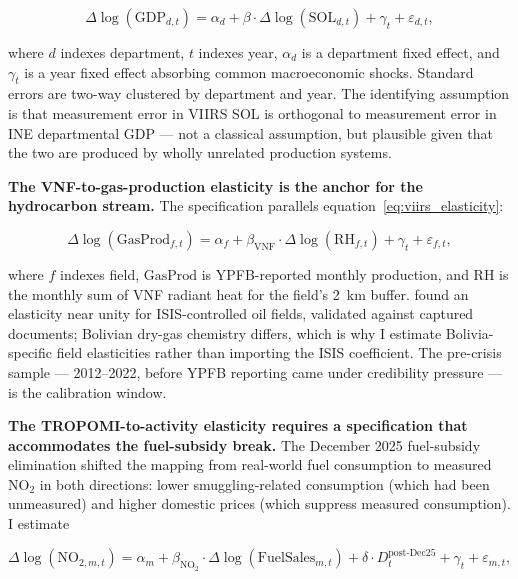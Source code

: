 \documentclass[11pt,letterpaper]{article}
\newcommand{\claim}[1]{\textbf{#1.}}
\begin{document}
\begin{equation}
\Delta \log(\text{GDP}_{d,t}) = \alpha_d + \beta \cdot \Delta \log(\text{SOL}_{d,t}) + \gamma_t + \varepsilon_{d,t},
\label{eq:viirs_elasticity}
\end{equation}

where $d$ indexes department, $t$ indexes year, $\alpha_d$ is a department fixed effect, and $\gamma_t$ is a year fixed effect absorbing common macroeconomic shocks. Standard errors are two-way clustered by department and year. The identifying assumption is that measurement error in VIIRS SOL is orthogonal to measurement error in INE departmental GDP --- not a classical assumption, but plausible given that the two are produced by wholly unrelated production systems.

\claim{The VNF-to-gas-production elasticity is the anchor for the hydrocarbon stream} The specification parallels equation~\eqref{eq:viirs_elasticity}:

\begin{equation}
\Delta \log(\text{GasProd}_{f,t}) = \alpha_f + \beta_{\text{VNF}} \cdot \Delta \log(\text{RH}_{f,t}) + \gamma_t + \varepsilon_{f,t},
\label{eq:vnf_elasticity}
\end{equation}

where $f$ indexes field, $\text{GasProd}$ is YPFB-reported monthly production, and $\text{RH}$ is the monthly sum of VNF radiant heat for the field's \num{2}~km buffer. \citet{do_etal2018} found an elasticity near unity for ISIS-controlled oil fields, validated against captured documents; Bolivian dry-gas chemistry differs, which is why I estimate Bolivia-specific field elasticities rather than importing the ISIS coefficient. The pre-crisis sample --- \numrange{2012}{2022}, before YPFB reporting came under credibility pressure --- is the calibration window.

\claim{The TROPOMI-to-activity elasticity requires a specification that accommodates the fuel-subsidy break} The December \num{2025} fuel-subsidy elimination shifted the mapping from real-world fuel consumption to measured NO$_2$ in both directions: lower smuggling-related consumption (which had been unmeasured) and higher domestic prices (which suppress measured consumption). I estimate

\begin{equation}
\Delta \log(\text{NO}_{2,m,t}) = \alpha_m + \beta_{\text{NO}_2} \cdot \Delta \log(\text{FuelSales}_{m,t}) + \delta \cdot D^{\text{post-Dec25}}_t + \gamma_t + \varepsilon_{m,t},
\label{eq:no2_elasticity}
\end{equation}
\end{document}
